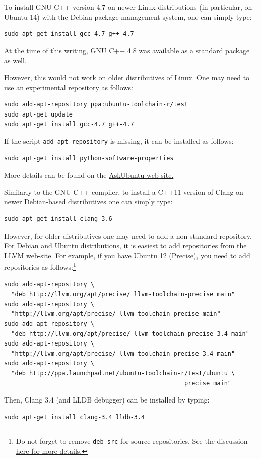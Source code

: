 \documentclass[runningheads,a4paper]{llncs}
\newcommand{\ttt}[1]{\texttt{#1}}
\begin{document}
{To install GNU C++ version 4.7 on newer Linux distributions (in particular, on Ubuntu 14) with the Debian package management system, 
one can simply type:
\begin{verbatim}
sudo apt-get install gcc-4.7 g++-4.7
\end{verbatim}
At the time of this writing, GNU C++ 4.8 was available as a standard package as well.


However, this would not work on older distributives of Linux. 
One may need to use an experimental repository as follows:
\begin{verbatim}
sudo add-apt-repository ppa:ubuntu-toolchain-r/test
sudo apt-get update
sudo apt-get install gcc-4.7 g++-4.7
\end{verbatim}
If the script \ttt{add-apt-repository} is missing, it can be installed as follows:
\begin{verbatim}
sudo apt-get install python-software-properties
\end{verbatim}
More details can be found on the \href{http://askubuntu.com/questions/113291/how-do-i-install-gcc-4-7}{AskUbuntu web-site.}

Similarly to the GNU C++ compiler, to install a C++11 version of Clang on newer Debian-based distributives one can simply type:
\begin{verbatim}
sudo apt-get install clang-3.6
\end{verbatim}

However, for older distributives one may need to add a non-standard repository.
For Debian and Ubuntu distributions, it is easiest to add repositories from \href{http://llvm.org/apt/}{the LLVM web-site}. 
For example, if you have Ubuntu 12 (Precise), you need to add repositories
as follows:\footnote{Do not forget to remove \ttt{deb-src} for source repositories.
See the discussion \href{http://askubuntu.com/questions/160511/why-does-add-apt-repository-fail-to-add-source-repositories}{here for more details.}}
\begin{verbatim}
sudo add-apt-repository \
  "deb http://llvm.org/apt/precise/ llvm-toolchain-precise main"
sudo add-apt-repository \
  "http://llvm.org/apt/precise/ llvm-toolchain-precise main"
sudo add-apt-repository \
  "deb http://llvm.org/apt/precise/ llvm-toolchain-precise-3.4 main"
sudo add-apt-repository \
  "http://llvm.org/apt/precise/ llvm-toolchain-precise-3.4 main"
sudo add-apt-repository \
  "deb http://ppa.launchpad.net/ubuntu-toolchain-r/test/ubuntu \
                                                  precise main"
\end{verbatim}
Then, Clang 3.4 (and LLDB debugger) can be installed by typing:
\begin{verbatim}
sudo apt-get install clang-3.4 lldb-3.4
\end{verbatim}

}
\end{document}
